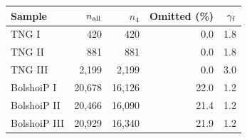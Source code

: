 \begin{tabular}{lrrrr}\toprule
Sample & $n_{\rm all}$ & $n_4$ & Omitted (\%) & $\gamma_{\rm f}$ \\\midrule
TNG I & 420 & 420 & 0.0 & 1.8 \\
TNG II & 881 & 881 & 0.0 & 1.8 \\
TNG III & 2,199 & 2,199 & 0.0 & 3.0 \\
BolshoiP I & 20,678 & 16,126 & 22.0 & 1.2 \\
BolshoiP II & 20,466 & 16,090 & 21.4 & 1.2 \\
BolshoiP III & 20,929 & 16,340 & 21.9 & 1.2 \\
\bottomrule\end{tabular}

